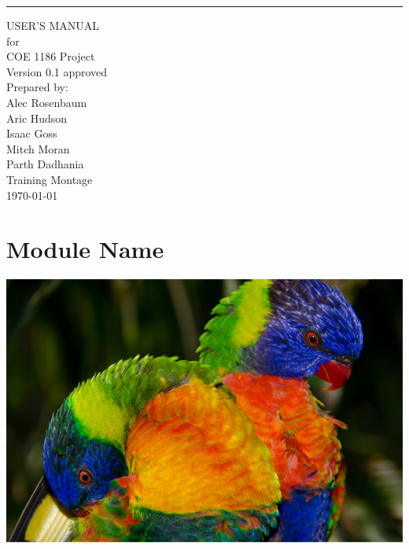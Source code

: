 \documentclass{scrreprt}
\date{}
\def\myversion{0.1 }
\begin{document}
\begin{flushright}
    \rule{16cm}{5pt}\vskip1cm
    \begin{bfseries}
        \Huge{USER'S MANUAL}\\
        \vspace{.9cm}
        for\\
        \vspace{.9cm}
        COE 1186 Project\\
        \vspace{.9cm}
        \LARGE{Version \myversion approved}\\
        \vspace{.9cm}
        Prepared by:\\
        Alec Rosenbaum\\
        Aric Hudson\\
        Isaac Goss\\
        Mitch Moran\\
        Parth Dadhania\\
        \vspace{1.9cm}
        Training Montage\\
        \vspace{.9cm}
        \today\\
    \end{bfseries}
\end{flushright}

\tableofcontents

\chapter{Module Name}

\includegraphics[width=\textwidth]{sample}
\end{document}
